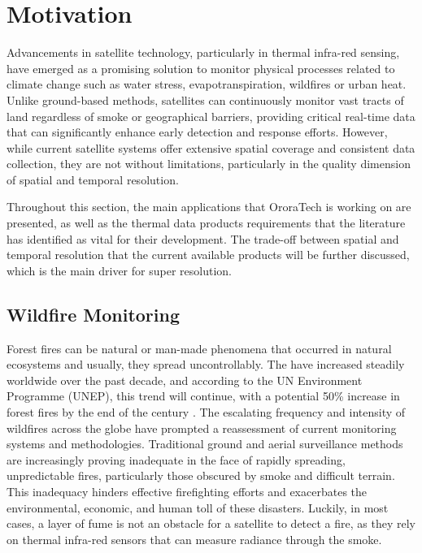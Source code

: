     
    \newpage
    

\section{Motivation}

Advancements in satellite technology, particularly in thermal infra-red sensing, have emerged as a promising solution to monitor physical processes related to climate change such as water stress, evapotranspiration, wildfires or urban heat.
Unlike ground-based methods, satellites can continuously monitor vast tracts of land regardless of smoke or geographical barriers, providing critical real-time data that can significantly enhance early detection and response efforts. 
However, while current satellite systems offer extensive spatial coverage and consistent data collection, they are not without limitations, particularly in the quality dimension of spatial and temporal resolution.

Throughout this section, the main applications that OroraTech is working on are presented, as well as the thermal data products requirements that the literature has identified as vital for their development.
The trade-off between spatial and temporal resolution that the current available products will be further discussed, which is the main driver for super resolution.
    

    \subsection{Wildfire Monitoring}

    Forest fires can be natural or man-made phenomena that occurred in natural ecosystems and usually, they spread uncontrollably.
    The have increased steadily worldwide over the past decade, and according to the UN Environment Programme (UNEP), this trend will continue, with a potential 50\% increase in forest fires by the end of the century \cite{UNEP2021Wildfire}. 
    The escalating frequency and intensity of wildfires across the globe have prompted a reassessment of current monitoring systems and methodologies. Traditional ground and aerial surveillance methods are increasingly proving inadequate in the face of rapidly spreading, unpredictable fires, particularly those obscured by smoke and difficult terrain. This inadequacy hinders effective firefighting efforts and exacerbates the environmental, economic, and human toll of these disasters. 
    Luckily, in most cases, a layer of fume is not an obstacle for a satellite to detect a fire, as they rely on thermal infra-red sensors that can measure radiance through the smoke.

